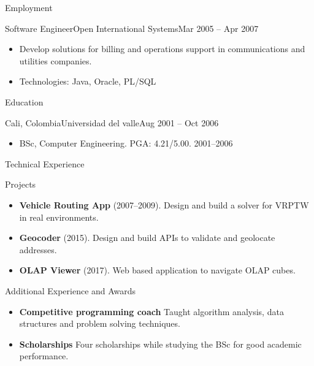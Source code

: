 \documentclass[]{mcdowellcv}
\begin{document}
\begin{cvsection}{Employment}
		\begin{cvsubsection}{Software Engineer}{Open International Systems}{Mar 2005 -- Apr 2007}	
			\begin{itemize}
				\item Develop solutions for billing and operations support in communications and utilities companies.
				\item Technologies: Java, Oracle, PL/SQL 	
			\end{itemize}
			
		\end{cvsubsection}
	\end{cvsection}
	
	\begin{cvsection}{Education}
		\begin{cvsubsection}{Cali, Colombia}{Universidad del valle}{Aug 2001 -- Oct 2006}
			\begin{itemize}
				\item BSc,	Computer	Engineering. PGA: 4.21/5.00. 2001--2006
			\end{itemize}
		\end{cvsubsection}
	\end{cvsection}
	
	\begin{cvsection}{Technical Experience}
		\begin{cvsubsection}{Projects}{}{}
			\begin{itemize}
				\item \textbf{Vehicle Routing App} (2007--2009). Design and build a solver for VRPTW in real environments.
				\item \textbf{Geocoder} (2015). Design and build APIs to validate and geolocate addresses. 
				\item \textbf{OLAP Viewer} (2017).  Web based application to navigate OLAP cubes.

			\end{itemize}
		\end{cvsubsection}
	\end{cvsection}
	
	\begin{cvsection}{Additional Experience and Awards}
		\begin{cvsubsection}{}{}{}	
			\begin{itemize}
				\item \textbf{Competitive programming coach} Taught algorithm analysis, data structures and problem solving techniques.
				\item \textbf{Scholarships} Four scholarships while studying the BSc for good academic performance.
			\end{itemize}
		\end{cvsubsection}
	\end{cvsection}
\end{document}

